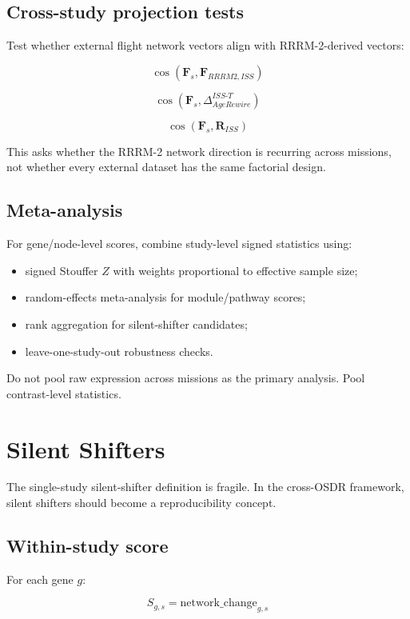 \documentclass[11pt]{article}
\begin{document}
\subsection{Cross-study projection tests}

Test whether external flight network vectors align with RRRM-2-derived vectors:

\[
\cos(\mathbf{F}_s, \mathbf{F}_{RRRM2,ISS})
\]

\[
\cos(\mathbf{F}_s, \Delta^{ISS\mbox{-}T}_{AgeRewire})
\]

\[
\cos(\mathbf{F}_s, \mathbf{R}_{ISS})
\]

This asks whether the RRRM-2 network direction is recurring across missions, not
whether every external dataset has the same factorial design.

\subsection{Meta-analysis}

For gene/node-level scores, combine study-level signed statistics using:

\begin{itemize}
  \item signed Stouffer $Z$ with weights proportional to effective sample size;
  \item random-effects meta-analysis for module/pathway scores;
  \item rank aggregation for silent-shifter candidates;
  \item leave-one-study-out robustness checks.
\end{itemize}

Do not pool raw expression across missions as the primary analysis. Pool
contrast-level statistics.

\section{Silent Shifters}

The single-study silent-shifter definition is fragile. In the cross-OSDR
framework, silent shifters should become a reproducibility concept.

\subsection{Within-study score}

For each gene $g$:

\[
S_{g,s} = \mathrm{network\_change}_{g,s}
\]
\end{document}
